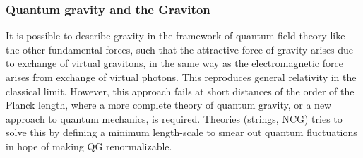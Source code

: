 \subsubsection{Quantum gravity and the Graviton}
It is possible to describe gravity in the framework of quantum field theory like the other fundamental forces, such that the attractive force of gravity arises due to exchange of virtual gravitons, in the same way as the electromagnetic force arises from exchange of virtual photons. This reproduces general relativity in the classical limit. However, this approach fails at short distances of the order of the Planck length, where a more complete theory of quantum gravity, or a new approach to quantum mechanics, is required. Theories (strings, NCG) tries to solve this by defining a minimum length-scale to smear out quantum fluctuations in hope of making QG renormalizable.